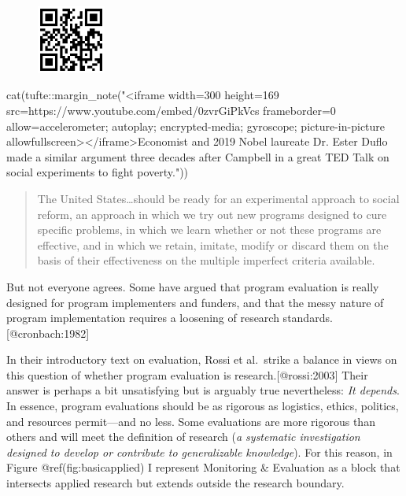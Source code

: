 \documentclass[
  letterpaper,
  DIV=11,
  numbers=noendperiod,
  oneside]{scrartcl}
\newenvironment{Shaded}{\begin{snugshade}}{\end{snugshade}}
\newcommand{\FunctionTok}[1]{\textcolor[rgb]{0.28,0.35,0.67}{#1}}
\newcommand{\NormalTok}[1]{\textcolor[rgb]{0.00,0.23,0.31}{#1}}
\newcommand{\SpecialCharTok}[1]{\textcolor[rgb]{0.37,0.37,0.37}{#1}}
\newcommand{\StringTok}[1]{\textcolor[rgb]{0.13,0.47,0.30}{#1}}
\begin{document}
\begin{figure}[H]

{\centering \includegraphics[width=0.2\textwidth,height=\textheight]{images/QR_pal.png}

}

\end{figure}

\begin{Shaded}
\begin{Highlighting}[]
\FunctionTok{cat}\NormalTok{(tufte}\SpecialCharTok{::}\FunctionTok{margin\_note}\NormalTok{(}\StringTok{"\textless{}iframe width=\textquotesingle{}300\textquotesingle{} height=\textquotesingle{}169\textquotesingle{} src=\textquotesingle{}https://www.youtube.com/embed/0zvrGiPkVcs\textquotesingle{} frameborder=\textquotesingle{}0\textquotesingle{} allow=\textquotesingle{}accelerometer; autoplay; encrypted{-}media; gyroscope; picture{-}in{-}picture\textquotesingle{} allowfullscreen\textgreater{}\textless{}/iframe\textgreater{}Economist and 2019 Nobel laureate Dr. Ester Duflo made a similar argument three decades after Campbell in a great TED Talk on social experiments to fight poverty."}\NormalTok{))}
\end{Highlighting}
\end{Shaded}

\begin{quote}
The United States\ldots should be ready for an experimental approach to
social reform, an approach in which we try out new programs designed to
cure specific problems, in which we learn whether or not these programs
are effective, and in which we retain, imitate, modify or discard them
on the basis of their effectiveness on the multiple imperfect criteria
available.
\end{quote}

But not everyone agrees. Some have argued that program evaluation is
really designed for program implementers and funders, and that the messy
nature of program implementation requires a loosening of research
standards.{[}@cronbach:1982{]}

In their introductory text on evaluation, Rossi et al.~strike a balance
in views on this question of whether program evaluation is
research.{[}@rossi:2003{]} Their answer is perhaps a bit unsatisfying
but is arguably true nevertheless: \emph{It depends}. In essence,
program evaluations should be as rigorous as logistics, ethics,
politics, and resources permit---and no less. Some evaluations are more
rigorous than others and will meet the definition of research (\emph{a
systematic investigation designed to develop or contribute to
generalizable knowledge}). For this reason, in Figure
@ref(fig:basicapplied) I represent Monitoring \& Evaluation as a block
that intersects applied research but extends outside the research
boundary.
\end{document}
